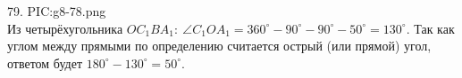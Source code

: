 79. {{PIC:g8-78.png}}\\
Из четырёхугольника $OC_1BA_1:\ \angle C_1OA_1=360^\circ-90^\circ-90^\circ-50^\circ=130^\circ.$ Так как углом между прямыми по определению считается острый (или прямой) угол, ответом будет $180^\circ-130^\circ=50^\circ.$\\
